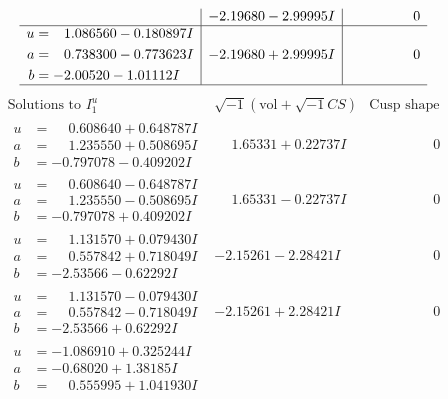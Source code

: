 \documentclass[1p]{elsarticle_modified}
\theoremstyle{definition}
\newcommand{\I}{\sqrt{-1}}
\begin{document}
$$\begin{array}{c|c|c}
 & -2.19680 - 2.99995 I & \phantom{-0.000000 } 0 \\ \hline\begin{aligned}
u &= \phantom{-}1.086560 - 0.180897 I \\
a &= \phantom{-}0.738300 - 0.773623 I \\
b &= -2.00520 - 1.01112 I\end{aligned}
 & -2.19680 + 2.99995 I & \phantom{-0.000000 } 0\\
 \hline 
 \end{array}$$\newpage$$\begin{array}{c|c|c}  
\text{Solutions to }I^u_{1}& \I (\text{vol} + \sqrt{-1}CS) & \text{Cusp shape}\\
 \hline 
\begin{aligned}
u &= \phantom{-}0.608640 + 0.648787 I \\
a &= \phantom{-}1.235550 + 0.508695 I \\
b &= -0.797078 - 0.409202 I\end{aligned}
 & \phantom{-}1.65331 + 0.22737 I & \phantom{-0.000000 } 0 \\ \hline\begin{aligned}
u &= \phantom{-}0.608640 - 0.648787 I \\
a &= \phantom{-}1.235550 - 0.508695 I \\
b &= -0.797078 + 0.409202 I\end{aligned}
 & \phantom{-}1.65331 - 0.22737 I & \phantom{-0.000000 } 0 \\ \hline\begin{aligned}
u &= \phantom{-}1.131570 + 0.079430 I \\
a &= \phantom{-}0.557842 + 0.718049 I \\
b &= -2.53566 - 0.62292 I\end{aligned}
 & -2.15261 - 2.28421 I & \phantom{-0.000000 } 0 \\ \hline\begin{aligned}
u &= \phantom{-}1.131570 - 0.079430 I \\
a &= \phantom{-}0.557842 - 0.718049 I \\
b &= -2.53566 + 0.62292 I\end{aligned}
 & -2.15261 + 2.28421 I & \phantom{-0.000000 } 0 \\ \hline\begin{aligned}
u &= -1.086910 + 0.325244 I \\
a &= -0.68020 + 1.38185 I \\
b &= \phantom{-}0.555995 + 1.041930 I\end{aligned}

\end{array}$$
\end{document}
